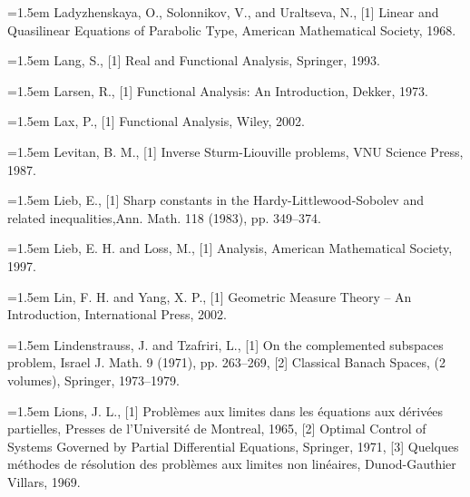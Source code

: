 \noindent\hangindent=1.5em Ladyzhenskaya, O., Solonnikov, V., and Uraltseva, N., \hypertarget{ref:LadyzhenskayaSolonnikovUraltseva-1}{[1]} Linear and Quasilinear Equations of Parabolic Type, American Mathematical Society, 1968.\par{}
\noindent\hangindent=1.5em Lang, S., \hypertarget{ref:Lang-1}{[1]} Real and Functional Analysis, Springer, 1993.\par{}
\noindent\hangindent=1.5em Larsen, R., \hypertarget{ref:Larsen-1}{[1]} Functional Analysis: An Introduction, Dekker, 1973.\par{}
\noindent\hangindent=1.5em Lax, P., \hypertarget{ref:Lax-1}{[1]} Functional Analysis, Wiley, 2002.\par{}
\noindent\hangindent=1.5em Levitan, B. M., \hypertarget{ref:Levitan-1}{[1]} Inverse Sturm-Liouville problems, VNU Science Press, 1987.\par{}
\noindent\hangindent=1.5em Lieb, E., \hypertarget{ref:Lieb-1}{[1]} Sharp constants in the Hardy-Littlewood-Sobolev and related inequalities,Ann. Math. 118 (1983), pp. 349--374.\par{}
\noindent\hangindent=1.5em Lieb, E. H. and Loss, M., \hypertarget{ref:Lieb-1}{[1]} Analysis, American Mathematical Society, 1997.\par{}
\noindent\hangindent=1.5em Lin, F. H. and Yang, X. P., \hypertarget{ref:LinYang-1}{[1]} Geometric Measure Theory -- An Introduction, International Press, 2002.\par{}
\noindent\hangindent=1.5em Lindenstrauss, J. and Tzafriri, L., \hypertarget{ref:LindenstraussTzafriri-1}{[1]} On the complemented subspaces problem, Israel J. Math. 9 (1971), pp. 263--269, \hypertarget{ref:LindenstraussTzafriri-2}{[2]} Classical Banach Spaces, (2 volumes), Springer, 1973--1979.\par{}
\noindent\hangindent=1.5em Lions, J. L., \hypertarget{ref:Lions-1}{[1]} Problèmes aux limites dans les équations aux dérivées partielles, Presses de l'Université de Montreal, 1965, \hypertarget{ref:Lions-2}{[2]} Optimal Control of Systems Governed by Partial Differential Equations, Springer, 1971, \hypertarget{ref:Lions-3}{[3]} Quelques méthodes de résolution des problèmes aux limites non linéaires, Dunod-Gauthier Villars, 1969.\par{}
